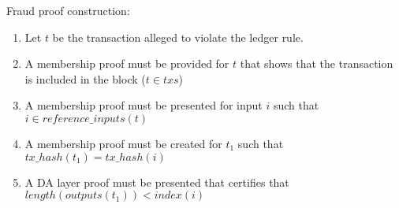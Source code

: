 \documentclass[../midgard.tex]{subfiles}
\begin{document}
Fraud proof construction:
\begin{enumerate}
  \item Let $t$ be the transaction alleged to violate the ledger rule. 
  \item A membership proof must be provided for $t$ that shows that the transaction is included in the block ($t \in txs$)
  \item A membership proof must be presented for input $i$ such that $i \in reference\_inputs(t)$
  \item A membership proof must be created for $t_1$ such that $tx\_hash(t_1) = tx\_hash(i)$
  \item A DA layer proof must be presented that certifies that $length(outputs(t_1)) < index(i)$
\end{enumerate}







\end{document}
